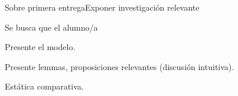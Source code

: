 \documentclass[notes, 11pt]{beamer} %
\newenvironment{wideitemize}{\itemize\addtolength{\itemsep}{10pt}}{\enditemize}
\begin{document}
\begin{frame}{Sobre primera entrega}{Exponer investigaci\'on relevante}
	\begin{wideitemize}
		\item<1-> Se busca que el alumno/a
		\begin{wideitemize}
			\item<2->[--] Presente el modelo.
			\item<3->[--] Presente lemmas, proposiciones relevantes (discusi\'on intuitiva).
			\item<4->[--] Est\'atica comparativa.
		\end{wideitemize}
	\end{wideitemize}
\end{frame}


\begin{frame}
\maketitle
\end{frame}
\end{document}
